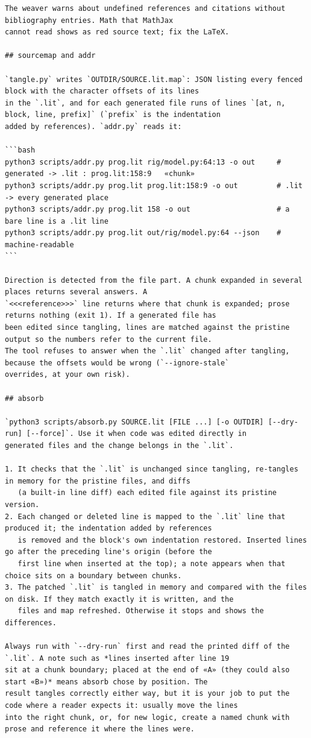 \documentclass[10pt,a4paper]{article}
\newcounter{chunk}
\begin{document}
\begin{Verbatim}
The weaver warns about undefined references and citations without bibliography entries. Math that MathJax
cannot read shows as red source text; fix the LaTeX.

## sourcemap and addr

`tangle.py` writes `OUTDIR/SOURCE.lit.map`: JSON listing every fenced block with the character offsets of its lines
in the `.lit`, and for each generated file runs of lines `[at, n, block, line, prefix]` (`prefix` is the indentation
added by references). `addr.py` reads it:

```bash
python3 scripts/addr.py prog.lit rig/model.py:64:13 -o out     # generated -> .lit : prog.lit:158:9   «chunk»
python3 scripts/addr.py prog.lit prog.lit:158:9 -o out         # .lit -> every generated place
python3 scripts/addr.py prog.lit 158 -o out                    # a bare line is a .lit line
python3 scripts/addr.py prog.lit out/rig/model.py:64 --json    # machine-readable
```

Direction is detected from the file part. A chunk expanded in several places returns several answers. A
`<<<reference>>>` line returns where that chunk is expanded; prose returns nothing (exit 1). If a generated file has
been edited since tangling, lines are matched against the pristine output so the numbers refer to the current file.
The tool refuses to answer when the `.lit` changed after tangling, because the offsets would be wrong (`--ignore-stale`
overrides, at your own risk).

## absorb

`python3 scripts/absorb.py SOURCE.lit [FILE ...] [-o OUTDIR] [--dry-run] [--force]`. Use it when code was edited directly in
generated files and the change belongs in the `.lit`.

1. It checks that the `.lit` is unchanged since tangling, re-tangles in memory for the pristine files, and diffs
   (a built-in line diff) each edited file against its pristine version.
2. Each changed or deleted line is mapped to the `.lit` line that produced it; the indentation added by references
   is removed and the block's own indentation restored. Inserted lines go after the preceding line's origin (before the
   first line when inserted at the top); a note appears when that choice sits on a boundary between chunks.
3. The patched `.lit` is tangled in memory and compared with the files on disk. If they match exactly it is written, and the
   files and map refreshed. Otherwise it stops and shows the differences.

Always run with `--dry-run` first and read the printed diff of the `.lit`. A note such as *lines inserted after line 19
sit at a chunk boundary; placed at the end of «A» (they could also start «B»)* means absorb chose by position. The
result tangles correctly either way, but it is your job to put the code where a reader expects it: usually move the lines
into the right chunk, or, for new logic, create a named chunk with prose and reference it where the lines were.


\end{Verbatim}
\end{document}
